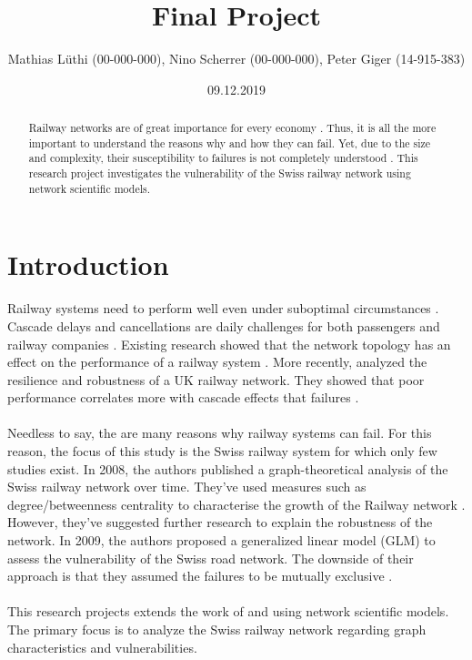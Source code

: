 \documentclass{Resources/netsci-project}
\begin{document}

\title{Final Project}
\author{Mathias Lüthi (00-000-000), Nino Scherrer (00-000-000), Peter Giger (14-915-383)}
\date{09.12.2019}

\maketitle

\begin{abstract}
Railway networks are of great importance for every economy \autocite{Resilience}. Thus, it is all the more important to understand the reasons why and how they can fail. Yet, due to the size and complexity, their susceptibility to failures is not completely understood \autocite{Resilience}. This research project investigates the vulnerability of the Swiss railway network using network scientific models.
\end{abstract}


\section{Introduction}
Railway systems need to perform well even under suboptimal circumstances \autocite{Resilience}. Cascade delays and cancellations are daily challenges for both passengers and railway companies \autocite{Resilience}. Existing research showed that the network topology has an effect on the performance of a railway system \autocite{ComplexTopology}. More recently, \textcite{Resilience} analyzed the resilience and robustness of a UK railway network. They showed that poor performance correlates more with cascade effects that failures \autocite{Resilience}.
\\~\\
Needless to say, the are many reasons why railway systems can fail. For this reason, the focus of this study is the Swiss railway system for which only few studies exist. In 2008, the authors \textcite{GraphSwiss} published a graph-theoretical analysis of the Swiss railway network over time. They've used measures such as degree/betweenness centrality to characterise the growth of the Railway network \autocite{GraphSwiss}. However, they've suggested further research to explain the robustness of the network. In 2009, the authors \textcite{VulnerabilitySwiss} proposed a generalized linear model (GLM) to assess the vulnerability of the Swiss road network. The downside of their approach is that they assumed the failures to be mutually exclusive \autocite{VulnerabilitySwiss}. 
\\~\\
This research projects extends the work of \textcite{GraphSwiss} and \textcite{VulnerabilitySwiss} using network scientific models. The primary focus is to analyze the Swiss railway network regarding graph characteristics and vulnerabilities.
\end{document}
